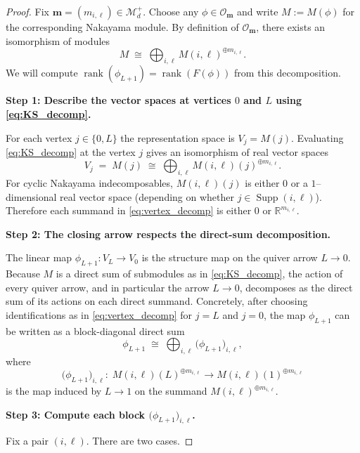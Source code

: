 \documentclass{article}
\newcommand{\rank}{\operatorname{rank}}
\newcommand{\Supp}{\operatorname{Supp}}
\theoremstyle{definition}
\begin{document}
\begin{proof}
Fix $\mathbf m=(m_{i,\ell})\in \mathcal M_d^+$.
Choose any $\phi\in\mathcal O_{\mathbf m}$ and write $M:=M(\phi)$ for the corresponding Nakayama module.
By definition of $\mathcal O_{\mathbf m}$, there exists an isomorphism of modules
\begin{equation}
\label{eq:KS_decomp}
M \;\cong\;\bigoplus_{i,\ell} M(i,\ell)^{\oplus m_{i,\ell}}.
\end{equation}
We will compute $\rank(\phi_{L+1})=\rank(F(\phi))$ from this decomposition.

\medskip\noindent
\textbf{Step 1: Describe the vector spaces at vertices $0$ and $L$ using \eqref{eq:KS_decomp}.}

For each vertex $j\in\{0,L\}$ the representation space is $V_j=M(j)$.
Evaluating \eqref{eq:KS_decomp} at the vertex $j$ gives an isomorphism of real vector spaces
\begin{equation}
\label{eq:vertex_decomp}
V_j
\;=\;
M(j)
\;\cong\;
\bigoplus_{i,\ell} M(i,\ell)(j)^{\oplus m_{i,\ell}}.
\end{equation}
For cyclic Nakayama indecomposables, $M(i,\ell)(j)$ is either $0$ or a $1$--dimensional real vector space
(depending on whether $j\in \Supp(i,\ell)$). Therefore each summand in \eqref{eq:vertex_decomp} is either
$0$ or $\mathbb{R}^{m_{i,\ell}}$.

\medskip\noindent
\textbf{Step 2: The closing arrow respects the direct-sum decomposition.}

The linear map $\phi_{L+1}:V_L\to V_0$ is the structure map on the quiver arrow $L\to 0$.
Because $M$ is a direct sum of submodules as in \eqref{eq:KS_decomp}, the action of every quiver arrow,
and in particular the arrow $L\to 0$, decomposes as the direct sum of its actions on each direct summand.
Concretely, after choosing identifications as in \eqref{eq:vertex_decomp} for $j=L$ and $j=0$,
the map $\phi_{L+1}$ can be written as a block-diagonal direct sum
\begin{equation}
\label{eq:block_sum}
\phi_{L+1}
\;\cong\;
\bigoplus_{i,\ell}
\big(\phi_{L+1}\big)_{i,\ell},
\end{equation}
where
\[
\big(\phi_{L+1}\big)_{i,\ell}:\;
M(i,\ell)(L)^{\oplus m_{i,\ell}}
\longrightarrow
M(i,\ell)(1)^{\oplus m_{i,\ell}}
\]
is the map induced by $L\to 1$ on the summand $M(i,\ell)^{\oplus m_{i,\ell}}$.

\medskip\noindent
\textbf{Step 3: Compute each block $\big(\phi_{L+1}\big)_{i,\ell}$.}

Fix a pair $(i,\ell)$. There are two cases.


\end{proof}
\end{document}
